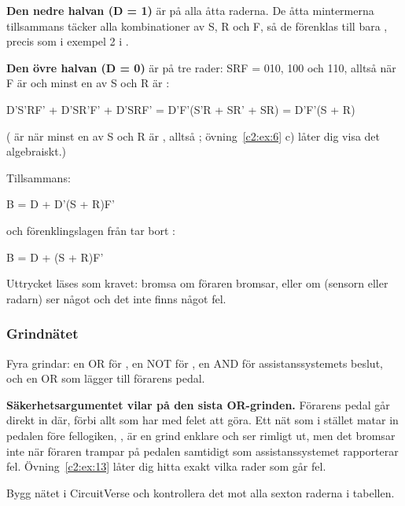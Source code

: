 \textbf{Den nedre halvan (D = 1)} är  på alla åtta raderna. De åtta mintermerna tillsammans
täcker alla kombinationer av S, R och F, så de förenklas till bara , precis som i exempel 2
i .

\textbf{Den övre halvan (D = 0)} är  på tre rader: SRF = 010, 100 och 110, alltså när F är
 och minst en av S och R är :

\begin{console}
D'S'RF' + D'SR'F' + D'SRF' = D'F'(S'R + SR' + SR) = D'F'(S + R)
\end{console}

\noindent (\mbox{} är  när minst en av S och R är , alltså
\mbox{}; övning~\ref{c2:ex:6} c) låter dig visa det algebraiskt.)

Tillsammans:

\begin{console}
B = D + D'(S + R)F'
\end{console}

\noindent och förenklingslagen \mbox{} från  tar bort :

\begin{console}
B = D + (S + R)F'
\end{console}

\noindent Uttrycket läses som kravet: bromsa om föraren bromsar, eller om (sensorn eller radarn)
ser något och det inte finns något fel.

\subsubsection{Grindnätet}
Fyra grindar: en OR för \mbox{}, en NOT för , en AND för assistanssystemets
beslut, och en OR som lägger till förarens pedal.


\textbf{Säkerhetsargumentet vilar på den sista OR-grinden.} Förarens pedal går direkt in där, förbi
allt som har med felet att göra. Ett nät som i stället matar in pedalen före fellogiken,
\mbox{}, är en grind enklare och ser rimligt ut, men det bromsar inte när
föraren trampar på pedalen samtidigt som assistanssystemet rapporterar fel. Övning~\ref{c2:ex:13}
låter dig hitta exakt vilka rader som går fel.

Bygg nätet i CircuitVerse och kontrollera det mot alla sexton raderna i tabellen.
